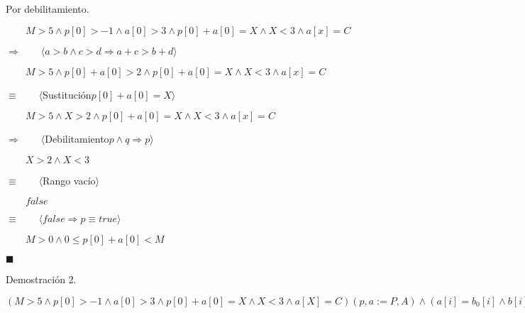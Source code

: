 \documentclass[hidelinks]{article}
\begin{document}
Por debilitamiento.\par
$\qquad M > 5 \land p[0] > -1 \land a[0] > 3 \land p[0] + a[0] = X \land X < 3 \land a[x] = C$\par
$\Rightarrow \qquad \langle a > b \land c > d \Rightarrow a + c > b + d \rangle$\par
$\qquad M > 5 \land p[0] + a[0] > 2 \land p[0] + a[0] = X \land X < 3 \land a[x] = C$\par
$\equiv \qquad \langle $Sustitución$ p[0] + a[0] = X \rangle$\par
$\qquad M > 5 \land X > 2 \land p[0] + a[0] = X \land X < 3 \land a[x] = C$\par
$\Rightarrow \qquad \langle $Debilitamiento$ p \land q \Rightarrow p \rangle$\par
$\qquad X > 2 \land X < 3 $\par
$\equiv \qquad \langle $Rango vacío$ \rangle$\par
$\qquad false $\par
$\equiv \qquad \langle false \Rightarrow p \equiv true \rangle$\par
$\qquad M > 0 \land 0 \leq p[0] + a[0] < M $\par
$\blacksquare $\par

Demostración 2.\par
$(M > 5 \land p[0] > -1 \land a[0] > 3 \land p[0] + a[0] = X \land X < 3 \land a[X] = C)(p,a := P,A) \land (a[i] = b_0[i] \land b[i] = a_0[i])(i,N,a_0,b_0,a,b := (p[0] + a[0])(p,a := P,A),M,P, A, p, a) \Rightarrow p[X] = C$\par
\end{document}
